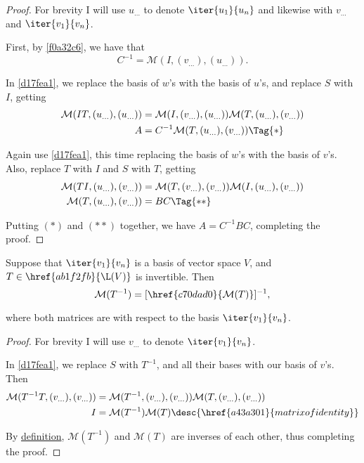 \begin{proof}
  \def\u{u_{\ldots}}
  \def\v{v_{\ldots}}
  \def\M{\mathcal{M}}

  For brevity I will use $u_{\ldots}$ to denote $\iter{u_1}{u_n}$ and likewise
  with $v_{\ldots}$ and $\iter{v_1}{v_n}$.

  First, by \autoref{f0a32c6}, we have that
  $$
    C^{-1}=\mathcal M(I,(\v),(\u)).
  $$

  In \autoref{d17fea1}, we replace the basis of $w$'s with the basis of $u$'s,
  and replace $S$ with $I$, getting
  \begin{align*}
    \M(IT,(\u),(\u)) &=\M(I,(\v),(\u))\M(T,(\u),(\v)) \\
    A                &=C^{-1}\M(T,(\u),(\v))\Tag{*}
  \end{align*}

  Again use \autoref{d17fea1}, this time replacing the basis of $w$'s with the
  basis of $v$'s. Also, replace $T$ with $I$ and $S$ with $T$, getting
  \begin{align*}
    \M(TI,(\u),(\v)) &=\M(T,(\v),(\v))\M(I,(\u),(\v)) \\
    \M(T,(\u),(\v))  &=BC\Tag{**}
  \end{align*}

  Putting $(*)$ and $(**)$ together, we have $A=C^{-1}BC$, completing the
  proof.
\end{proof}

\label{b259e2d}

Suppose that $\iter{v_1}{v_n}$ is a basis of vector space $V$, and
$T\in\href{ab1f2fb}{\L(V)}$ is invertible. Then
$$
  \mathcal M(T^{-1})=[\href{c70dad0}{\mathcal M(T)}]^{-1},
$$

where both matrices are with respect to the basis $\iter{v_1}{v_n}$.

\begin{proof}
  \def\v{v_{\ldots}}
  \def\M{\mathcal{M}}
  For brevity I will use $v_{\ldots}$ to denote $\iter{v_1}{v_n}$.

  In \autoref{d17fea1}, we replace $S$ with $T^{-1}$, and all their bases with
  our basis of $v$'s. Then
  \begin{align*}
    \M(T^{-1}T,(\v),(\v)) &=\M(T^{-1},(\v),(\v))\M(T,(\v),(\v))                      \\
    I                     &=\M(T^{-1})\M(T)\desc{\href{a43a301}{matrix of identity}}
  \end{align*}

  By \href{ce4daa8}{definition}, $\M(T^{-1})$ and $\M(T)$ are inverses of each
  other, thus completing the proof.
\end{proof}
